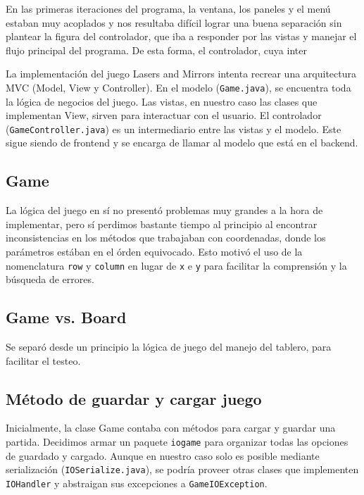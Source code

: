 \documentclass[a4paper, 11pt]{article}
\begin{document}
	En las primeras iteraciones del programa, la ventana, los paneles y el menú estaban muy acoplados y nos resultaba difícil lograr una buena separación sin plantear la figura del controlador, que iba a responder por las vistas y manejar el flujo principal del programa. De esta forma, el controlador, cuya inter 
	
	La implementación del juego Lasers and Mirrors intenta recrear una arquitectura MVC (Model, View y Controller). En el modelo (\texttt{Game.java}), se encuentra toda la lógica de negocios del juego. Las vistas, en nuestro caso las clases que implementan View, sirven para interactuar con el usuario. El controlador (\texttt{GameController.java}) es un intermediario entre las vistas y el modelo. Este sigue siendo de frontend y se encarga de llamar al modelo que está en el backend.

	\subsection{Game}
	La lógica del juego en sí no presentó problemas muy grandes a la hora de implementar, pero sí perdimos bastante tiempo al principio al encontrar inconsistencias en los métodos que trabajaban con coordenadas, donde los parámetros estában en el órden equivocado. Esto motivó el uso de la nomenclatura \texttt{row} y \texttt{column} en lugar de \texttt{x} e \texttt{y} para facilitar la comprensión y la búsqueda de errores. 

	\subsection{Game vs. Board}
	Se separó desde un principio la lógica de juego del manejo del tablero, para facilitar el testeo.
		
	\subsection{Método de guardar y cargar juego}
	Inicialmente, la clase Game contaba con métodos para cargar y guardar una partida. Decidimos armar un paquete \texttt{iogame} para organizar todas las opciones de guardado y cargado. Aunque en nuestro caso solo es posible mediante serialización (\texttt{IOSerialize.java}), se podría proveer otras clases que implementen \texttt{IOHandler} y abstraigan sus excepciones a \texttt{GameIOException}.
\end{document}
